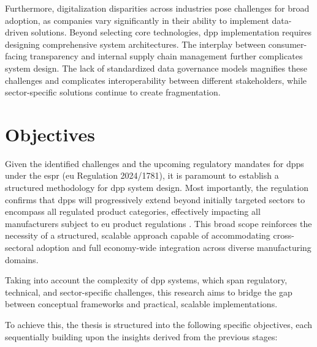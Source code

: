 Furthermore, digitalization disparities across industries pose challenges for broad adoption, as companies vary significantly in their ability to implement data-driven solutions. Beyond selecting core technologies, \ac{dpp} implementation requires designing comprehensive system architectures. The interplay between consumer-facing transparency and internal supply chain management further complicates system design. The lack of standardized data governance models magnifies these challenges and complicates interoperability between different stakeholders, while sector-specific solutions continue to create fragmentation. 


\section{Objectives}
\label{sec:objectives}

Given the identified challenges and the upcoming regulatory mandates for \ac{dpp}s under the \ac{espr} (\ac{eu} Regulation 2024/1781), it is paramount to establish a structured methodology for \ac{dpp} system design. Most importantly, the regulation confirms that \ac{dpp}s will progressively extend beyond initially targeted sectors to encompass all regulated product categories, effectively impacting all manufacturers subject to \ac{eu} product regulations \autocite{EuropeanParliamentandCouncil.2024}. This broad scope reinforces the necessity of a structured, scalable approach capable of accommodating cross-sectoral adoption and full economy-wide integration across diverse manufacturing domains.

Taking into account the complexity of \ac{dpp} systems, which span regulatory, technical, and sector-specific challenges, this research aims to bridge the gap between conceptual frameworks and practical, scalable implementations.

To achieve this, the thesis is structured into the following specific objectives, each sequentially building upon the insights derived from the previous stages:

